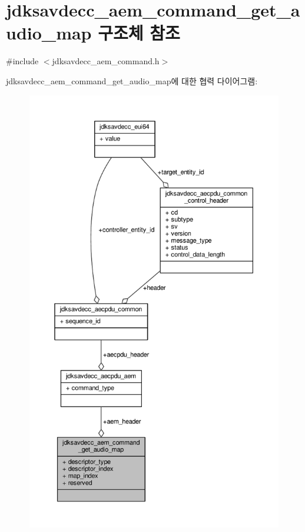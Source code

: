 \hypertarget{structjdksavdecc__aem__command__get__audio__map}{}\section{jdksavdecc\+\_\+aem\+\_\+command\+\_\+get\+\_\+audio\+\_\+map 구조체 참조}
\label{structjdksavdecc__aem__command__get__audio__map}


{\ttfamily \#include $<$jdksavdecc\+\_\+aem\+\_\+command.\+h$>$}



jdksavdecc\+\_\+aem\+\_\+command\+\_\+get\+\_\+audio\+\_\+map에 대한 협력 다이어그램\+:
\nopagebreak
\begin{figure}[H]
\begin{center}
\leavevmode
\includegraphics[height=550pt]{structjdksavdecc__aem__command__get__audio__map__coll__graph}
\end{center}
\end{figure}
